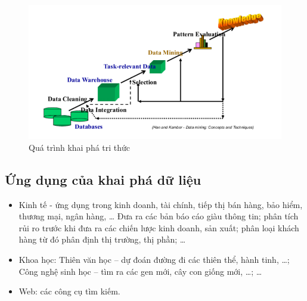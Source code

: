 \begin{figure}[!htbp]
    \centering
    \includegraphics[scale=0.7]{datamining}
    \caption{Quá trình khai phá tri thức}
    \label{fig:x cubed graph}
\end{figure}
\FloatBarrier
\subsection{Ứng dụng của khai phá dữ liệu}
\begin{itemize}
    \item Kinh tế - ứng dụng trong kinh doanh, tài chính, tiếp thị bán hàng, bảo hiểm,
    thương mại, ngân hàng, … Đưa ra các bản báo cáo giàu thông tin; phân tích rủi ro
    trước khi đưa ra các chiến lược kinh doanh, sản xuất; phân loại khách hàng từ đó phân định thị trường, thị phần; …
    \item Khoa học: Thiên văn học – dự đoán đường đi các thiên thể, hành tinh, …;
    Công nghệ sinh học – tìm ra các gen mới, cây con giống mới, …; …
    \item Web: các công cụ tìm kiếm.  
\end{itemize}